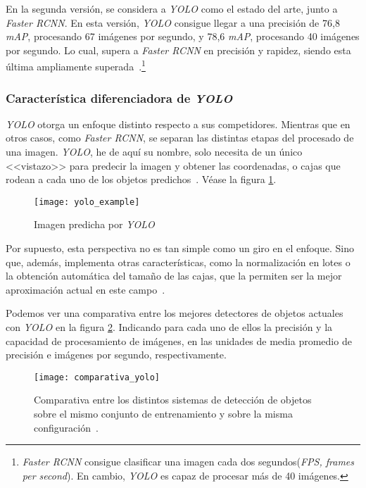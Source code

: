 En la segunda versión, se considera a \textit{YOLO} como el estado del arte, junto a \textit{Faster RCNN}. En esta versión, \textit{YOLO} consigue llegar a una precisión de 76,8 \textit{mAP}, procesando 67 imágenes por segundo, y 78,6 \textit{mAP}, procesando 40 imágenes por segundo. Lo cual, supera a \textit{Faster RCNN} en precisión y rapidez, siendo esta última ampliamente superada~\cite{yolov2}.\footnote{\textit{Faster RCNN} consigue clasificar una imagen cada dos segundos(\textit{FPS, frames per second}). En cambio, \textit{YOLO} es capaz de procesar más de 40 imágenes.}

\subsubsection{Característica diferenciadora de \textit{YOLO}}

\textit{YOLO} otorga un enfoque distinto respecto a sus competidores. Mientras que en otros casos, como \textit{Faster RCNN}, se separan las distintas etapas del procesado de una imagen. \textit{YOLO}, he de aquí su nombre, solo necesita de un único <<vistazo>> para predecir la imagen y obtener las coordenadas, o cajas que rodean a cada uno de los objetos predichos~\cite{yolo}. Véase la figura \ref{fig:3.2.14}.

\begin{figure}[h]
\centering
\texttt{[image: yolo\_example]}
\caption{Imagen predicha por \textit{YOLO}}
\label{fig:3.2.14}
\end{figure}

Por supuesto, esta perspectiva no es tan simple como un giro en el enfoque. Sino que, además, implementa otras características, como la normalización en lotes o la obtención automática del tamaño de las cajas, que la permiten ser la mejor aproximación actual en este campo~\cite{yolov2}.

Podemos ver una comparativa entre los mejores detectores de objetos actuales con \textit{YOLO} en la figura \ref{fig:3.2.13}. Indicando para cada uno de ellos la precisión y la capacidad de procesamiento de imágenes, en las unidades de media promedio de precisión e imágenes por segundo, respectivamente.

\begin{figure}[h]
\centering
\texttt{[image: comparativa\_yolo]}
\caption[Comparativa entre los distintos sistemas de detección de objetos]{Comparativa entre los distintos sistemas de detección de objetos sobre el mismo conjunto de entrenamiento y sobre la misma configuración~\cite{yolov2}.}
\label{fig:3.2.13}
\end{figure}


